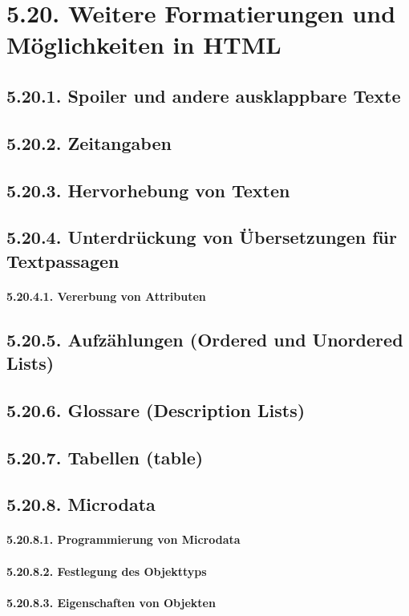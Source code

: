 \section{5.20.	Weitere Formatierungen und Möglichkeiten in HTML}
\subsection{5.20.1.	Spoiler und andere ausklappbare Texte}
\subsection{5.20.2.	Zeitangaben}
\subsection{5.20.3.	Hervorhebung von Texten}
\subsection{5.20.4.	Unterdrückung von Übersetzungen für Textpassagen}
\paragraph{5.20.4.1.	Vererbung von Attributen}
\subsection{5.20.5.	Aufzählungen (Ordered und Unordered Lists)}
\subsection{5.20.6.	Glossare (Description Lists)}
\subsection{5.20.7.	Tabellen (table)}
\subsection{5.20.8.	Microdata}
\paragraph{5.20.8.1.	Programmierung von Microdata}
\paragraph{5.20.8.2.	Festlegung des Objekttyps}
\paragraph{5.20.8.3.	Eigenschaften von Objekten}
